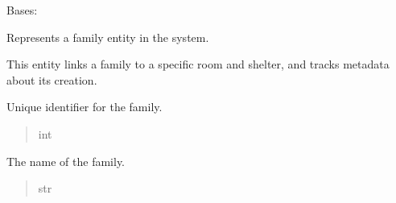 \documentclass[letterpaper,10pt,english]{sphinxmanual}
\begin{document}
\begin{fulllineitems}
\label{\detokenize{app.mysql:app.mysql.family.Family}}
\pysigstartsignatures
\pysiglinewithargsret
{}
{}
{}
\pysigstopsignatures
\sphinxAtStartPar
Bases: 

\sphinxAtStartPar
Represents a family entity in the system.

\sphinxAtStartPar
This entity links a family to a specific room and shelter,
and tracks metadata about its creation.

\begin{fulllineitems}
\label{\detokenize{app.mysql:app.mysql.family.Family.idFamily}}
\pysigstartsignatures
\pysigline
{}
\pysigstopsignatures
\sphinxAtStartPar
Unique identifier for the family.
\begin{quote}\begin{description}
\sphinxAtStartPar
int

\end{description}\end{quote}

\end{fulllineitems}


\begin{fulllineitems}
\label{\detokenize{app.mysql:app.mysql.family.Family.familyName}}
\pysigstartsignatures
\pysigline
{}
\pysigstopsignatures
\sphinxAtStartPar
The name of the family.
\begin{quote}\begin{description}
\sphinxAtStartPar
str

\end{description}\end{quote}

\end{fulllineitems}



\end{fulllineitems}
\end{document}

